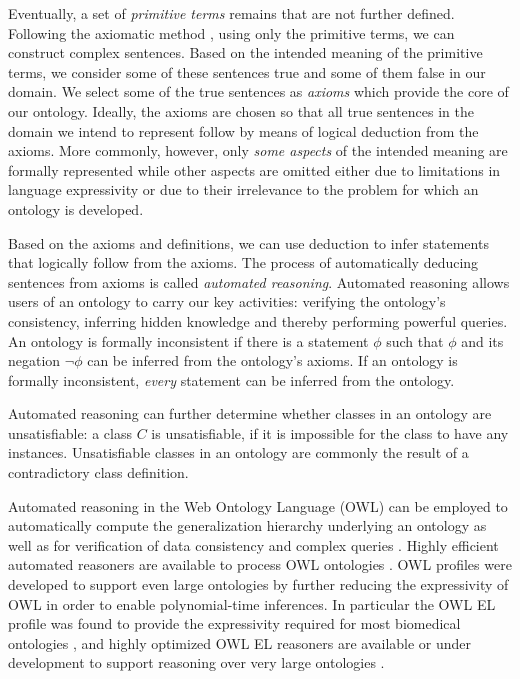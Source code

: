 \documentclass{bioinfo}
\renewcommand{\cite}{\citep}
\begin{document}
Eventually, a set of {\em primitive terms} remains that are not
further defined. Following the axiomatic method \cite{Hilbert1918},
using only the primitive terms, we can construct complex
sentences. Based on the intended meaning of the primitive terms, we
consider some of these sentences true and some of them false in our
domain. We select some of the true sentences as {\em axioms} which
provide the core of our ontology. Ideally, the axioms are chosen so
that all true sentences in the domain we intend to represent follow by
means of logical deduction from the axioms. More commonly, however,
only {\em some aspects} of the intended meaning are formally
represented while other aspects are omitted either due to limitations
in language expressivity or due to their irrelevance to the problem
for which an ontology is developed.

Based on the axioms and definitions, we can use deduction to infer
statements that logically follow from the axioms.  The process of
automatically deducing sentences from axioms is called {\em automated
  reasoning}. Automated reasoning allows users of an ontology to carry
our key activities: verifying the ontology's consistency, inferring
hidden knowledge and thereby performing powerful queries.  An ontology
is formally inconsistent if there is a statement $\phi$ such that
$\phi$ and its negation $\neg \phi$ can be inferred from the
ontology's axioms.  If an ontology is formally inconsistent, {\em
  every} statement can be inferred from the ontology.  

Automated reasoning can further determine whether classes in an
ontology are unsatisfiable: a class $C$ is unsatisfiable, if it is
impossible for the class to have any instances. Unsatisfiable classes
in an ontology are commonly the result of a contradictory class
definition. %

Automated reasoning in the Web Ontology Language (OWL) can be employed
to automatically compute the generalization hierarchy underlying an
ontology as well as for verification of data consistency and complex
queries \cite{Hoehndorf2011incon, Hoehndorf2011models}. Highly
efficient automated reasoners are available to process OWL ontologies
\cite{Sirin2004, Tsarkov2006, Motik2009a}. OWL profiles were developed
to support even large ontologies by further reducing the expressivity
of OWL in order to enable polynomial-time inferences. In particular
the OWL EL profile was found to provide the expressivity required for
most biomedical ontologies \cite{el4, elvira}, and highly optimized
OWL EL reasoners are available or under development to support
reasoning over very large ontologies \cite{el4, cbreasoner}.
\end{document}
